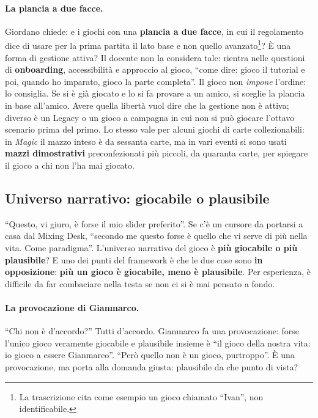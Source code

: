 \paragraph{La plancia a due facce.} Giordano chiede: e i giochi con una
\textbf{plancia a due facce}, in cui il regolamento dice di usare per la prima
partita il lato base e non quello avanzato\footnote{La trascrizione cita come
esempio un gioco chiamato ``Ivan'', non identificabile.}? È una forma di
gestione attiva? Il docente non la considera tale: rientra nelle questioni di
\textbf{onboarding}, accessibilità e approccio al gioco, ``come dire: gioco il
tutorial e poi, quando ho imparato, gioco la parte completa''. Il gioco non
\emph{impone} l'ordine: lo consiglia. Se si è già giocato e lo si fa provare a
un amico, si sceglie la plancia in base all'amico. Avere quella libertà vuol dire
che la gestione non è attiva; diverso è un Legacy o un gioco a campagna in cui
non si può giocare l'ottavo scenario prima del primo. Lo stesso vale per alcuni
giochi di carte collezionabili: in \emph{Magic} il mazzo inteso è da sessanta
carte, ma in vari eventi si sono usati \textbf{mazzi dimostrativi} preconfezionati
più piccoli, da quaranta carte, per spiegare il gioco a chi non l'ha mai
giocato.

\subsection{Universo narrativo: giocabile o plausibile}
\label{a3:sec:plausibile}

``Questo, vi giuro, è forse il mio slider preferito''. Se c'è un cursore da
portarsi a casa dal Mixing Desk, ``secondo me questo forse è quello che vi serve
di più nella vita. Come paradigma''. L'universo narrativo del gioco è
\textbf{più giocabile o più plausibile}? E uno dei punti del framework è che le
due cose sono \textbf{in opposizione}: \textbf{più un gioco è giocabile, meno è
plausibile}. Per esperienza, è difficile da far combaciare nella testa se non ci
si è mai pensato a fondo.

\paragraph{La provocazione di Gianmarco.} ``Chi non è d'accordo?'' Tutti
d'accordo. Gianmarco fa una provocazione: forse l'unico gioco veramente giocabile
e plausibile insieme è ``il gioco della nostra vita: io gioco a essere
Gianmarco''. ``Però quello non è un gioco, purtroppo''. È una provocazione, ma
porta alla domanda giusta: plausibile da che punto di vista?

